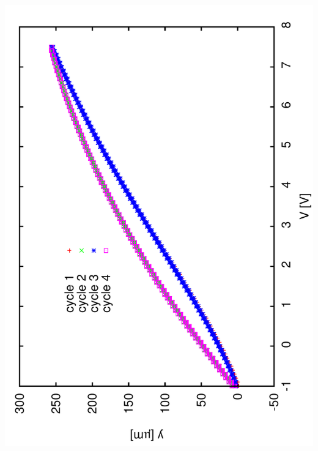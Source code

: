 \documentclass[a4paper,11pt]{book}
\begin{document}
\includegraphics[angle=-90,scale=0.10]{image32.pdf}\hspace*{2cm}
\end{document}
